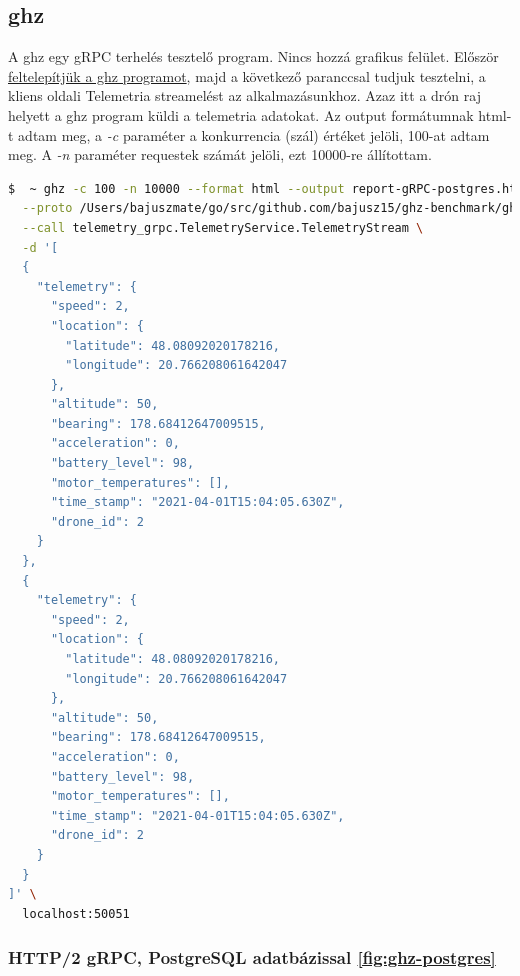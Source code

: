 \subsection{ghz}
A ghz egy gRPC terhelés tesztelő program. Nincs hozzá grafikus felület.
Először \href{https://github.com/bojand/ghz}{feltelepítjük a ghz programot}, majd a következő paranccsal tudjuk tesztelni, a kliens oldali Telemetria streamelést az alkalmazásunkhoz.
Azaz itt a drón raj helyett a ghz program küldi a telemetria adatokat.
Az output formátumnak html-t adtam meg, a \textit{-c} paraméter a konkurrencia (szál) értéket jelöli, 100-at adtam meg.
A \textit{-n} paraméter requestek számát jelöli, ezt 10000-re állítottam.

\begin{lstlisting}[language=bash]
  $  ~ ghz -c 100 -n 10000 --format html --output report-gRPC-postgres.html  --insecure \
  --proto /Users/bajuszmate/go/src/github.com/bajusz15/ghz-benchmark/ghz/cmd/benchmark/protobuf/telemetry.proto \
  --call telemetry_grpc.TelemetryService.TelemetryStream \
  -d '[
  {
    "telemetry": {
      "speed": 2,
      "location": {
        "latitude": 48.08092020178216,
        "longitude": 20.766208061642047
      },
      "altitude": 50,
      "bearing": 178.68412647009515,
      "acceleration": 0,
      "battery_level": 98,
      "motor_temperatures": [],
      "time_stamp": "2021-04-01T15:04:05.630Z",
      "drone_id": 2
    }
  },
  {
    "telemetry": {
      "speed": 2,
      "location": {
        "latitude": 48.08092020178216,
        "longitude": 20.766208061642047
      },
      "altitude": 50,
      "bearing": 178.68412647009515,
      "acceleration": 0,
      "battery_level": 98,
      "motor_temperatures": [],
      "time_stamp": "2021-04-01T15:04:05.630Z",
      "drone_id": 2
    }
  }
]' \
  localhost:50051
\end{lstlisting}

\subsubsection{HTTP/2 gRPC, PostgreSQL adatbázissal \ref{fig:ghz-postgres}}


